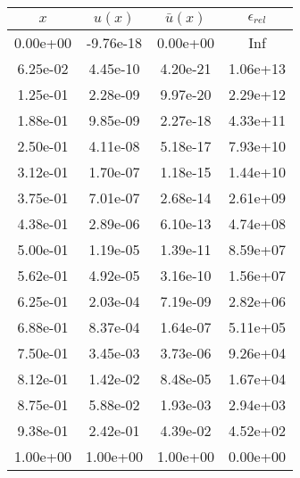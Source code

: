 \begin{tabular}{|c|c|c|c|}
\hline
\textbf{$x$}&\textbf{$u(x)$}&\textbf{$\bar{u}(x)$}&\textbf{$\epsilon_{rel}$}\\\hline
0.00e+00&-9.76e-18&0.00e+00&Inf\\\hline
6.25e-02&4.45e-10&4.20e-21&1.06e+13\\\hline
1.25e-01&2.28e-09&9.97e-20&2.29e+12\\\hline
1.88e-01&9.85e-09&2.27e-18&4.33e+11\\\hline
2.50e-01&4.11e-08&5.18e-17&7.93e+10\\\hline
3.12e-01&1.70e-07&1.18e-15&1.44e+10\\\hline
3.75e-01&7.01e-07&2.68e-14&2.61e+09\\\hline
4.38e-01&2.89e-06&6.10e-13&4.74e+08\\\hline
5.00e-01&1.19e-05&1.39e-11&8.59e+07\\\hline
5.62e-01&4.92e-05&3.16e-10&1.56e+07\\\hline
6.25e-01&2.03e-04&7.19e-09&2.82e+06\\\hline
6.88e-01&8.37e-04&1.64e-07&5.11e+05\\\hline
7.50e-01&3.45e-03&3.73e-06&9.26e+04\\\hline
8.12e-01&1.42e-02&8.48e-05&1.67e+04\\\hline
8.75e-01&5.88e-02&1.93e-03&2.94e+03\\\hline
9.38e-01&2.42e-01&4.39e-02&4.52e+02\\\hline
1.00e+00&1.00e+00&1.00e+00&0.00e+00\\\hline
\end{tabular}
